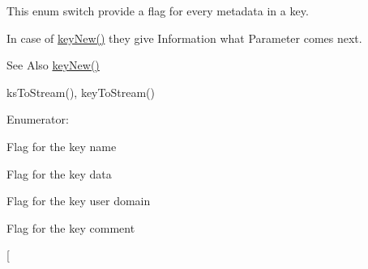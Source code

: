 This enum switch provide a flag for every metadata in a key.

In case of \hyperlink{group__key_gaf6893c038b3ebee90c73a9ea8356bebf}{key\-New()} they give Information what Parameter comes next.

\begin{DoxySeeAlso}{See Also}
\hyperlink{group__key_gaf6893c038b3ebee90c73a9ea8356bebf}{key\-New()} 

ks\-To\-Stream(), key\-To\-Stream() 
\end{DoxySeeAlso}
\begin{Desc}
\item[Enumerator\-: ]\par
\begin{description}
\item[{\em 
\hypertarget{group__key_gga91fb3178848bd682000958089abbaf40ad6127fc38f96410bf7c8f6e93b0397da}{K\-E\-Y\-\_\-\-N\-A\-M\-E}\label{group__key_gga91fb3178848bd682000958089abbaf40ad6127fc38f96410bf7c8f6e93b0397da}
}]Flag for the key name \item[{\em 
\hypertarget{group__key_gga91fb3178848bd682000958089abbaf40ac66e4a49d09212b79f5754ca6db5bd2e}{K\-E\-Y\-\_\-\-V\-A\-L\-U\-E}\label{group__key_gga91fb3178848bd682000958089abbaf40ac66e4a49d09212b79f5754ca6db5bd2e}
}]Flag for the key data \item[{\em 
\hypertarget{group__key_gga91fb3178848bd682000958089abbaf40a77ca60362fa8daca8d5347db4385068b}{K\-E\-Y\-\_\-\-O\-W\-N\-E\-R}\label{group__key_gga91fb3178848bd682000958089abbaf40a77ca60362fa8daca8d5347db4385068b}
}]Flag for the key user domain \item[{\em 
\hypertarget{group__key_gga91fb3178848bd682000958089abbaf40ac29427bb47cc31689d02912e36161ee3}{K\-E\-Y\-\_\-\-C\-O\-M\-M\-E\-N\-T}\label{group__key_gga91fb3178848bd682000958089abbaf40ac29427bb47cc31689d02912e36161ee3}
}]Flag for the key comment \item[{\em 
}
\end{description}
\end{Desc}
